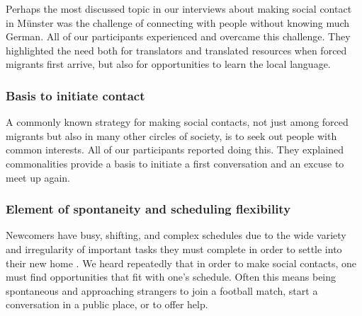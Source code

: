 Perhaps the most discussed topic in our interviews about making social contact in Münster was the challenge of connecting with people without knowing much German. All of our participants experienced and overcame this challenge. They highlighted the need both for translators and translated resources when forced migrants first arrive, but also for opportunities to learn the local language.

\subsubsection*{Basis to initiate contact}

A commonly known strategy for making social contacts, not just among forced migrants but also in many other circles of society, is to seek out people with common interests. All of our participants reported doing this. They explained commonalities provide a basis to initiate a first conversation and an excuse to meet up again.

\subsubsection*{Element of spontaneity and scheduling flexibility}

Newcomers have busy, shifting, and complex schedules due to the wide variety and irregularity of important tasks they must complete in order to settle into their new home \cite[p. 17]{bustamante_duarte_exploring_2018}. We heard repeatedly that in order to make social contacts, one must find opportunities that fit with one's schedule. Often this means being spontaneous and approaching strangers to join a football match, start a conversation in a public place, or to offer help.


